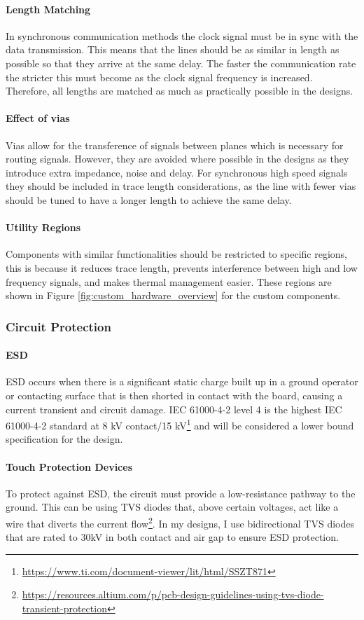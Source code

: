 \paragraph{Length Matching}
In synchronous communication methods the clock signal must be in sync with the data transmission. This means that the lines should be as similar in length as possible so that they arrive at the same delay. The faster the communication rate the stricter this must become as the clock signal frequency is increased. Therefore, all lengths are matched as much as practically possible in the designs.
\paragraph{Effect of vias}
Vias allow for the transference of signals between planes which is necessary for routing signals. However, they are avoided where possible in the designs as they introduce extra impedance, noise and delay. For synchronous high speed signals they should be included in trace length considerations, as the line with fewer vias should be tuned to have a longer length to achieve the same delay.
\paragraph{Utility Regions}
Components with similar functionalities should be restricted to specific regions, this is because it reduces trace length, prevents interference between high and low frequency signals, and makes thermal management easier. These regions are shown in Figure \ref{fig:custom_hardware_overview} for the custom components.

\subsubsection{Circuit Protection}\label{sub_sub_section:tgt_circuit_protection}
\paragraph{\gls{ESD}}
\gls{ESD} occurs when there is a significant static charge built up in a ground operator or contacting surface that is then shorted in contact with the board, causing a current transient and circuit damage. IEC 61000-4-2 level 4 is the highest IEC 61000-4-2 standard at 8 kV contact/15 kV\footnote{\url{https://www.ti.com/document-viewer/lit/html/SSZT871}} and will be considered a lower bound specification for the design. 
\paragraph{Touch Protection Devices}
To protect against \gls{ESD}, the circuit must provide a low-resistance pathway to the ground. This can be using \gls{TVS} diodes that, above certain voltages, act like a wire that diverts the current flow\footnote{\url{https://resources.altium.com/p/pcb-design-guidelines-using-tvs-diode-transient-protection}}. In my designs, I use bidirectional \gls{TVS} diodes that are rated to 30kV in both contact and air gap \cite{vishay} to ensure \gls{ESD} protection. 
